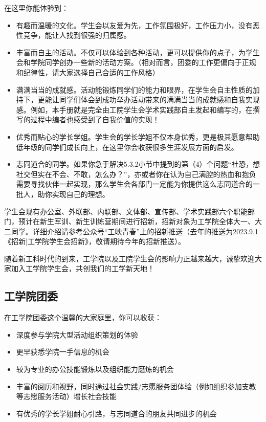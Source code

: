 \documentclass[11pt,oneside]{book}
\begin{document}
在这里你能体验到：
\begin{itemize}
    \item 有趣而温暖的文化。学生会以友爱为先，工作氛围极好，工作压力小，没有恶性竞争，能让人找到很强的归属感。
    \item 丰富而自主的活动。不仅可以体验到各种活动，更可以提供你的点子，为学生会和学院同学创办一些新的活动方案。（相对而言，团委的工作更偏向于正规和纪律性，请大家选择自己合适的工作风格）
    \item 满满当当的成就感。活动能锻炼同学们的能力和眼界，在学生会自主性质的加持下，更能让同学们体会到成功举办活动带来的满满当当的成就感和自我实现感。例如，本手册就是完全由工院学生会学术实践部自主发起和编写的，在撰写的过程中编者也感受到了自我价值的实现！
    \item 优秀而贴心的学长学姐。学生会的学长学姐不仅本身优秀，更是极其愿意帮助低年级的同学们成长向上，在这里你会收获很多生涯发展方面的启发。
    \item 志同道合的同学。如果你急于解决5.3.2小节中提到的第（4）个问题“社恐，想社交但实在不会、不敢，怎么办？”，亦或者你在认为自己满腔的热血和抱负需要寻找伙伴一起实现，那么学生会各部门一定能为你提供这么志同道合的一批人，助你实现自己的理想。
\end{itemize}
学生会现有办公室、外联部、内联部、文体部、宣传部、学术实践部六个职能部门，预计在新生军训、新生训练营期间进行招新，招新对象为工学院全体大一、大二同学。详细介绍请参考公众号“工映青春”上的招新推送（去年的推送为2023.9.1《招新|工学院学生会招新》，敬请期待今年的招新推送）。

随着新工科时代的到来，工学院以及工院学生会的影响力正越来越大，诚挚欢迎大家加入工学院学生会，共创我们的工学新天地！
\subsection{工学院团委}

在工学院团委这个温馨的大家庭里，你可以收获：

\begin{itemize}

    \item 深度参与学院大型活动组织策划的体验
    \item 更早获悉学院一手信息的机会
    \item 较为专业的办公技能锻炼以及组织能力磨炼的机会
    \item 丰富的阅历和视野，同时通过社会实践/志愿服务团体验（例如组织参加支教等志愿服务活动）增长社会技能
    \item 有优秀的学长学姐耐心引路，与志同道合的朋友共同进步的机会
\end{itemize}
\end{document}
